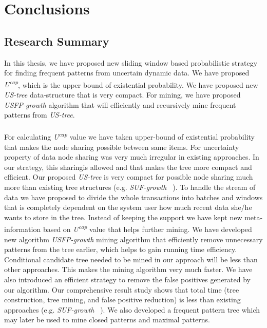 \chapter{Conclusions}
\section{Research Summary}
In this thesis, we have proposed new sliding window based probabilistic strategy for finding frequent patterns from uncertain dynamic data. We have proposed \emph{U\textsuperscript{cap}}, which is the upper bound of existential probability. We have proposed new \emph{US-tree} data-structure that is very compact. For mining, we have proposed \emph{USFP-growth} algorithm that will efficiently and recursively mine frequent patterns from \emph{US-tree}.\\
\\
For calculating \emph{U\textsuperscript{cap}} value we have taken upper-bound of existential probability that makes the node sharing possible between same items. For uncertainty property of data node sharing was very much irregular in existing approaches. In our strategy, this sharingis allowed and that makes the tree more compact and efficient. Our proposed \emph{US-tree} is very compact for possible node sharing much more than existing tree structures (e.g. \emph{SUF-growth} ~\cite{suf_growth}). To handle the stream of data we have proposed to divide the whole transactions into batches and windows that is completely dependent on the system user how much recent data she/he wants to store in the tree. Instead of keeping the support we have kept new meta-information based on \emph{U\textsuperscript{cap}} value that helps further mining. We have developed new algorithm \emph{USFP-growth} mining algorithm that efficiently remove unnecessary patterns from the tree earlier, which helps to gain running time efficiency. Conditional candidate tree needed to be mined in our approach will be less than other approaches. This makes the mining algorithm very much faster. We have also introduced an efficient strategy to remove the false positives generated by our algorithm. Our comprehensive result study shows that total time (tree construction, tree mining, and false positive reduction) is less than existing approaches (e.g. \emph{SUF-growth} ~\cite{suf_growth}). We also developed a frequent pattern tree which may later be used to mine closed patterns and maximal patterns.
